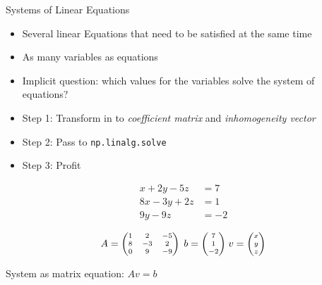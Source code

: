 \begin{frame}[fragile]{Systems of Linear Equations}
%
\begin{itemize}
\item Several linear Equations that need to be satisfied at the same time
\item As many variables as equations
\item Implicit question: which values for the variables solve the system of equations?
\item Step 1: Transform in to \emph{coefficient matrix} and \emph{inhomogeneity vector}
\item Step 2: Pass to \texttt{np.linalg.solve}
\item Step 3: Profit
\end{itemize}
%
\begin{tcbraster}[raster columns=2,
                  raster equal height,
                  nobeforeafter,
                  raster column skip=0.2cm]
\begin{tcolorbox}[title=Example]
\begin{align*}
	 x + 2y - 5z &=  7 \\
	8x - 3y + 2z &=  1 \\
	     9y - 9z &= -2
\end{align*}
\end{tcolorbox}
%
\begin{tcolorbox}[title=Coefficient Matrix{,} Inhomogeneity]
\begin{align*}
\scriptsize
A = \begin{pmatrix}
	1 &  2 & -5 \\
	8 & -3 &  2 \\
	0 &  9 & -9
\end{pmatrix}
~
b = \mqty(7 \\ 1 \\ -2)
~
v = \mqty(x \\ y \\ z)
\end{align*}

System as matrix equation: $Av = b$
\end{tcolorbox}
\end{tcbraster}
%
\end{frame}


